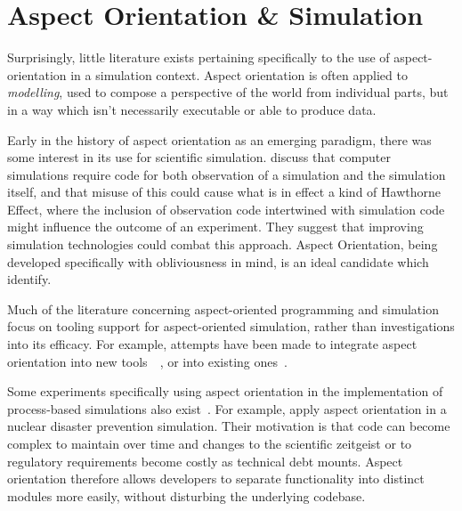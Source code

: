 \subsection{}


\section{Aspect Orientation \& Simulation}

Surprisingly, little literature exists pertaining specifically to the use of
aspect-orientation in a simulation context. Aspect orientation is often applied
to \emph{modelling}, used to compose a perspective of the world from individual
parts, but in a way which isn't necessarily executable or able to produce data.

Early in the history of aspect orientation as an emerging paradigm, there was
some interest in its use for scientific simulation. \cite{gulyas1999use} discuss
that computer simulations require code for both observation of a simulation and
the simulation itself, and that misuse of this could cause what is in effect a
kind of Hawthorne Effect, where the inclusion
of observation code intertwined with simulation code might influence the
outcome of an experiment. They suggest that improving simulation technologies
could combat this approach. Aspect Orientation, being developed specifically
with obliviousness in mind, is an ideal candidate which \citeauthor{gulyas1999use}
identify.

Much of the literature concerning aspect-oriented programming and simulation
focus on tooling support for aspect-oriented simulation, rather than
investigations into its efficacy. For example, attempts have been made to
integrate aspect orientation into new
tools~\cite{DEVSaspectorientation2008aksu}~,
or into existing ones~\cite{chibani2019using}. 

Some experiments specifically using aspect orientation in the implementation of
process-based simulations also exist\cite{Ionescu_2009}~. For
example, \citeauthor{Ionescu_2009} apply aspect orientation in a nuclear
disaster prevention simulation. Their motivation is that code can become complex
to maintain over time and changes to the scientific zeitgeist or to regulatory
requirements become costly as technical debt mounts. Aspect orientation
therefore allows developers to separate functionality into distinct modules more
easily, without disturbing the underlying codebase.

